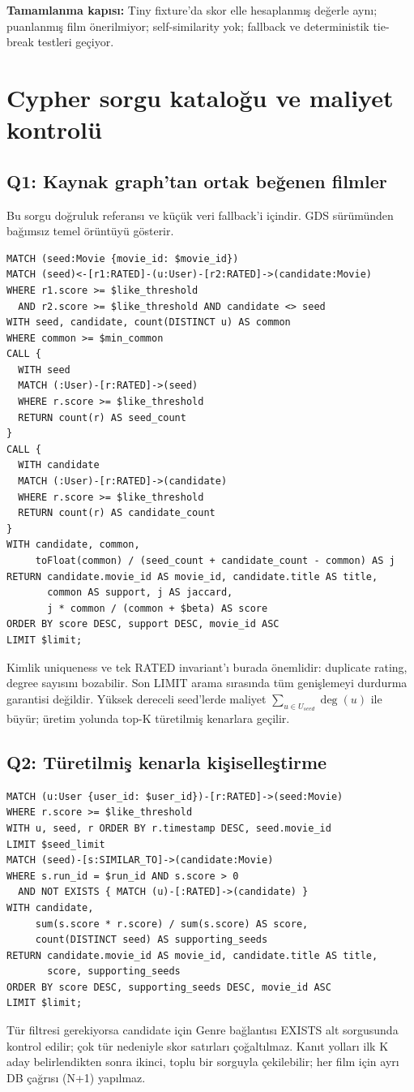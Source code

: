 \documentclass[11pt,a4paper]{article}
\newcommand{\gate}[1]{\par\smallskip\noindent\colorbox{pale}{\parbox{0.96\linewidth}{\textbf{Tamamlanma kapısı:} #1}}\par\smallskip}
\begin{document}
\gate{Tiny fixture'da skor elle hesaplanmış değerle aynı; puanlanmış film önerilmiyor; self-similarity yok; fallback ve deterministik tie-break testleri geçiyor.}

\section{Cypher sorgu kataloğu ve maliyet kontrolü}
\subsection{Q1: Kaynak graph'tan ortak beğenen filmler}
Bu sorgu doğruluk referansı ve küçük veri fallback'i içindir. GDS sürümünden bağımsız temel örüntüyü gösterir.
\begin{lstlisting}
MATCH (seed:Movie {movie_id: $movie_id})
MATCH (seed)<-[r1:RATED]-(u:User)-[r2:RATED]->(candidate:Movie)
WHERE r1.score >= $like_threshold
  AND r2.score >= $like_threshold AND candidate <> seed
WITH seed, candidate, count(DISTINCT u) AS common
WHERE common >= $min_common
CALL {
  WITH seed
  MATCH (:User)-[r:RATED]->(seed)
  WHERE r.score >= $like_threshold
  RETURN count(r) AS seed_count
}
CALL {
  WITH candidate
  MATCH (:User)-[r:RATED]->(candidate)
  WHERE r.score >= $like_threshold
  RETURN count(r) AS candidate_count
}
WITH candidate, common,
     toFloat(common) / (seed_count + candidate_count - common) AS j
RETURN candidate.movie_id AS movie_id, candidate.title AS title,
       common AS support, j AS jaccard,
       j * common / (common + $beta) AS score
ORDER BY score DESC, support DESC, movie_id ASC
LIMIT $limit;
\end{lstlisting}
Kimlik uniqueness ve tek RATED invariant'ı burada önemlidir: duplicate rating, degree sayısını bozabilir. Son LIMIT arama sırasında tüm genişlemeyi durdurma garantisi değildir. Yüksek dereceli seed'lerde maliyet $\sum_{u\in U_{seed}}\deg(u)$ ile büyür; üretim yolunda top-K türetilmiş kenarlara geçilir.

\subsection{Q2: Türetilmiş kenarla kişiselleştirme}
\begin{lstlisting}
MATCH (u:User {user_id: $user_id})-[r:RATED]->(seed:Movie)
WHERE r.score >= $like_threshold
WITH u, seed, r ORDER BY r.timestamp DESC, seed.movie_id
LIMIT $seed_limit
MATCH (seed)-[s:SIMILAR_TO]->(candidate:Movie)
WHERE s.run_id = $run_id AND s.score > 0
  AND NOT EXISTS { MATCH (u)-[:RATED]->(candidate) }
WITH candidate,
     sum(s.score * r.score) / sum(s.score) AS score,
     count(DISTINCT seed) AS supporting_seeds
RETURN candidate.movie_id AS movie_id, candidate.title AS title,
       score, supporting_seeds
ORDER BY score DESC, supporting_seeds DESC, movie_id ASC
LIMIT $limit;
\end{lstlisting}
Tür filtresi gerekiyorsa candidate için Genre bağlantısı EXISTS alt sorgusunda kontrol edilir; çok tür nedeniyle skor satırları çoğaltılmaz. Kanıt yolları ilk K aday belirlendikten sonra ikinci, toplu bir sorguyla çekilebilir; her film için ayrı DB çağrısı (N+1) yapılmaz.
\end{document}
